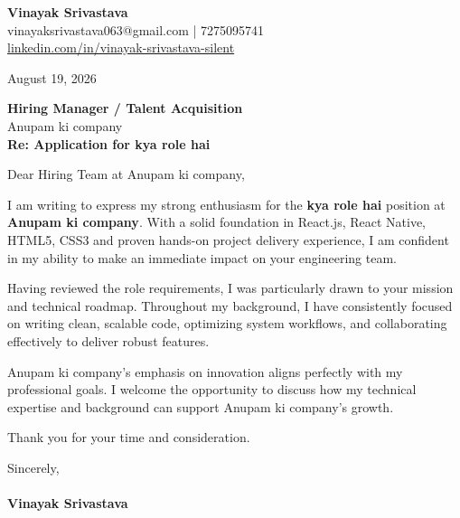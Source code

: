 \documentclass[11pt,a4paper]{article}
\begin{document}
\thispagestyle{empty}

{\Large \textbf{Vinayak Srivastava}}\\
vinayaksrivastava063@gmail.com | 7275095741 \\
\url{linkedin.com/in/vinayak-srivastava-silent}

\vspace{1em}
\hfill August 19, 2026

\textbf{Hiring Manager / Talent Acquisition}\\
Anupam ki company\\

\vspace{1.5em}
\textbf{Re: Application for kya role hai }

\vspace{1em}
Dear Hiring Team at Anupam ki company,

I am writing to express my strong enthusiasm for the \textbf{kya role hai } position at \textbf{Anupam ki company}. With a solid foundation in React.js, React Native, HTML5, CSS3 and proven hands-on project delivery experience, I am confident in my ability to make an immediate impact on your engineering team.

Having reviewed the role requirements, I was particularly drawn to your mission and technical roadmap. Throughout my background, I have consistently focused on writing clean, scalable code, optimizing system workflows, and collaborating effectively to deliver robust features.

Anupam ki company's emphasis on innovation aligns perfectly with my professional goals. I welcome the opportunity to discuss how my technical expertise and background can support Anupam ki company's growth.

Thank you for your time and consideration.

\vspace{1.5em}
Sincerely,\\
\vspace{1em}\\
\textbf{Vinayak Srivastava}
\end{document}
